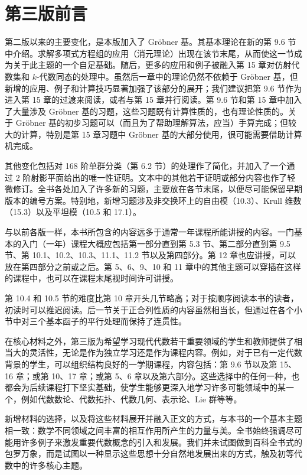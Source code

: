\chapter*{第三版前言}

第二版以来的主要变化，是本版加入了 Gröbner 基。其基本理论在新的第 9.6 节中介绍。求解多项式方程组的应用（消元理论）出现在该节末尾，从而使这一节成为关于此主题的一个自足基础。随后，更多的应用和例子被融入第 15 章对仿射代数集和 \(k\)-代数同态的处理中。虽然后一章中的理论仍然不依赖于 Gröbner 基，但新增的应用、例子和计算技巧显著加强了该部分的展开；我们建议把第 9.6 节作为进入第 15 章的过渡来阅读，或者与第 15 章并行阅读。第 9.6 节和第 15 章中加入了大量涉及 Gröbner 基的习题，这些习题既有计算性质的，也有理论性质的。关于 Gröbner 基的初步习题可以（而且为了帮助理解算法，应当）手算完成；但较大的计算，特别是第 15 章习题中 Gröbner 基的大部分使用，很可能需要借助计算机完成。

其他变化包括对 168 阶单群分类（第 6.2 节）的处理作了简化，并加入了一个通过 2 阶射影平面给出的唯一性证明。文本中的其他若干证明或部分内容也作了轻微修订。全书各处加入了许多新的习题，主要放在各节末尾，以便尽可能保留早期版本的编号方案。特别地，新增习题涉及非交换环上的自由模（10.3）、Krull 维数（15.3）以及平坦模（10.5 和 17.1）。

与以前各版一样，本书所包含的内容远多于通常一年课程所能讲授的内容。一门基本的入门（一年）课程大概应包括第一部分直到第 5.3 节、第二部分直到第 9.5 节、第 10.1、10.2、10.3、11.1、11.2 节以及第四部分。第 12 章也应讲授，可以放在第四部分之前或之后。第 5、6、9、10 和 11 章中的其他主题可以穿插在这样的课程中，也可以在课程末尾视时间许可讲授。

第 10.4 和 10.5 节的难度比第 10 章开头几节略高；对于按顺序阅读本书的读者，初读时可以推迟阅读。后一节关于正合列性质的内容虽然相当长，但通过在各个小节中对三个基本函子的平行处理而保持了连贯性。

在核心材料之外，第三版为希望学习现代代数若干重要领域的学生和教师提供了相当大的灵活性，无论是作为独立学习还是作为课程内容。例如，对于已有一定代数背景的学生，可以组织结构良好的一学期课程，内容包括：第 9.6 节以及第 15、16 章；或第 10、17 章；或第 5、6 章以及第六部分。这些选择中的任何一种，也都会为后续课程打下坚实基础，使学生能够更深入地学习许多可能领域中的某一个，例如代数数论、代数拓扑、代数几何、表示论、Lie 群等等。

新增材料的选择，以及将这些材料展开并融入正文的方式，与本书的一个基本主题相一致：数学不同领域之间丰富的相互作用所产生的力量与美。全书始终强调尽可能用许多例子来激发重要代数概念的引入和发展。我们并未试图做到百科全书式的包罗万象，而是试图以一种显示这些思想十分自然地发展出来的方式，触及初等代数中的许多核心主题。

